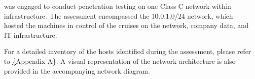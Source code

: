 \team was engaged to conduct penetration testing on one Class C network within \clientP infrastructure. The assessment encompassed the 10.0.1.0/24 network, which hosted the machines in control of the cruises on the network, company data, and IT infrastructure.

\bigskip


For a detailed inventory of the hosts identified during the assessment, please refer to \hyperref[sec:networkHostsAppendix]\{Appendix A\}. A visual representation of the network architecture is also provided in the accompanying network diagram.
